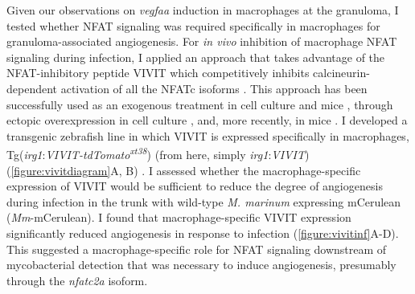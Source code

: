 Given our observations on \textit{vegfaa} induction in macrophages at the granuloma, I tested whether NFAT signaling was required specifically in macrophages for granuloma\hyp{}associated angiogenesis. For \textit{in vivo} inhibition of macrophage NFAT signaling during infection, I applied an approach that takes advantage of the NFAT\hyp{}inhibitory peptide VIVIT which competitively inhibits calcineurin\hyp{}dependent activation of all the NFATc isoforms \citep{Aramburu1999}. This approach has been successfully used as an exogenous treatment in cell culture \citep{Deerhake2021} and mice \citep{Noguchi2004, Elloumi2012, Rojanathammanee2015}, through ectopic overexpression in cell culture \citep{McCullagh2004},  and, more recently, in mice \citep{Poli2022, Peuker2022}. I developed a transgenic zebrafish line in which VIVIT is expressed specifically in macrophages, Tg(\textit{irg1}:\textit{VIVIT\hyp{}tdTomato\textsuperscript{xt38}}) (from here, simply \textit{irg1}:\textit{VIVIT}) (\autoref{figure:vivitdiagram}A, B) \citep{Sanderson2015}. I assessed whether the macrophage\hyp{}specific expression of VIVIT would be sufficient to reduce the degree of angiogenesis during infection in the trunk with wild\hyp{}type \textit{M. marinum} expressing mCerulean (\textit{Mm}\hyp{}mCerulean). I found that macrophage\hyp{}specific VIVIT expression significantly reduced angiogenesis in response to infection (\autoref{figure:vivitinf}A\hyp{}D). This suggested a macrophage\hyp{}specific role for NFAT signaling downstream of mycobacterial detection that was necessary to induce angiogenesis, presumably through the \textit{nfatc2a} isoform.

